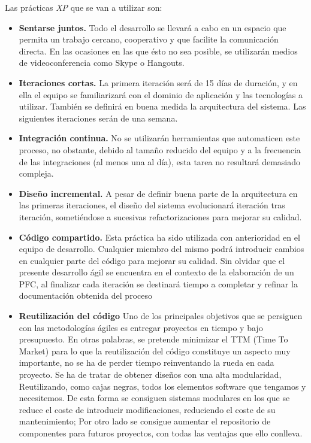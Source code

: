 Las prácticas \emph{XP} que se van a utilizar son: 

\begin{itemize}
\item \textbf{Sentarse juntos.} Todo el desarrollo se llevará a cabo en un espacio que permita un trabajo cercano, cooperativo y que facilite la comunicación directa. En las ocasiones en las que ésto no sea posible, se utilizarán medios de videoconferencia como Skype o Hangouts. 

\item \textbf{Iteraciones cortas.} La  primera  iteración  será  de  15  días  de  duración, y en ella el equipo se familiarizará con el dominio de aplicación y las tecnologías a utilizar.  También se definirá en buena medida la arquitectura del sistema. Las siguientes iteraciones serán de una semana. 
 
\item \textbf{Integración continua.} No se utilizarán herramientas que automaticen este proceso, no obstante, debido al tamaño reducido del equipo y a la frecuencia de las integraciones (al menos una al día), esta tarea no resultará demasiado compleja. 

\item \textbf{Diseño incremental.} A pesar de definir buena parte de la arquitectura en las primeras iteraciones, el diseño del sistema evolucionará iteración tras iteración, sometiéndose a sucesivas refactorizaciones para mejorar su calidad.  

\item \textbf{Código compartido.} Esta práctica ha sido utilizada con anterioridad en el equipo de desarrollo. Cualquier miembro del mismo podrá introducir cambios en cualquier parte del código para mejorar su calidad. Sin olvidar que el presente desarrollo ágil se encuentra en el contexto de la elaboración de un PFC,  al  finalizar  cada  iteración  se  destinará  tiempo  a  completar  y  refinar  la  documentación obtenida del proceso

\item \textbf{Reutilización del código} Uno de los principales objetivos que se persiguen con las metodologías ágiles es entregar proyectos en tiempo y bajo presupuesto. En otras palabras, se pretende minimizar el TTM (Time To Market) para lo que la reutilización del código constituye un aspecto muy importante, no se ha de perder tiempo reinventando la rueda en cada proyecto. Se ha de tratar de obtener diseños con una alta modularidad, Reutilizando, como cajas negras, todos los elementos software que tengamos y necesitemos. De esta forma se consiguen sistemas modulares en los que se reduce el coste de introducir modificaciones, reduciendo el coste de su mantenimiento; Por otro lado se consigue aumentar el repositorio de componentes para futuros proyectos, con todas las ventajas que ello conlleva. 


\end{itemize}
